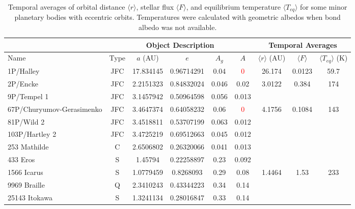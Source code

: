 \documentclass[a4paper,fleqn,usenatbib]{mnras}
\newcommand{\fix}{\textcolor{red}}
\begin{document}
\begin{table}
\begin{threeparttable}
\centering
\caption{Temporal averages of orbital distance $\langle r \rangle$, stellar flux $\langle F \rangle$, and equilibrium temperature $\langle T_{eq} \rangle$ for some minor planetary bodies with eccentric orbits. Temperatures were calculated with geometric albedos when bond albedo was not available.}
\begin{tabular}{ l c c c c c c c c }
 \hline
 \hline
 & \multicolumn{5}{c}{Object Description\tnote{a}} & \multicolumn{3}{c}{Temporal Averages\tnote{d}} \\
 \hline
 Name & Type & $a$ (AU) & $e$ & $A_g$\tnote{b} & $A$\tnote{c} & $\langle r \rangle$ (AU) & $\langle F \rangle$ & $\langle T_{eq} \rangle$ (K) \\ 
 \hline
 1P/Halley & JFC & 17.834145 & 0.96714291 & 0.04 & \fix{0} & 26.174  & 0.0123 & 59.7 \\  
 2P/Encke & JFC & 2.2151323 & 0.84832024 & 0.046 & 0.02 & 3.0122  & 0.384 & 174 \\
 
 9P/Tempel 1 & JFC & 3.1457942 & 0.50964598 & 0.056 & 0.013 \\


 67P/Churyumov-Gerasimenko & JFC & 3.4647374 & 0.64058232 & 0.06 & \fix{0} & 4.1756  & 0.1084 & 143 \\

 81P/Wild 2 & JFC & 3.4518811 & 0.53707199 & 0.063 & 0.012 \\ 

 103P/Hartley 2 & JFC & 3.4725219 & 0.69512663 & 0.045 & 0.012 \\

 253 Mathilde & C & 2.6506802 & 0.26320066 & 0.041 & 0.013 \\

 433 Eros & S & 1.45794 & 0.22258897 & 0.23 & 0.092 \\


 1566 Icarus & S & 1.0779459 & 0.8268093 & 0.29 & 0.08 & 1.4464  & 1.53 & 233 \\

 9969 Braille & Q & 2.3410243 & 0.43344223 & 0.34 & 0.14 \\

 25143 Itokawa & S & 1.3241134 & 0.28016847 & 0.33 & 0.14 \\
 

\end{tabular}
\end{threeparttable}
\end{table}
\end{document}
